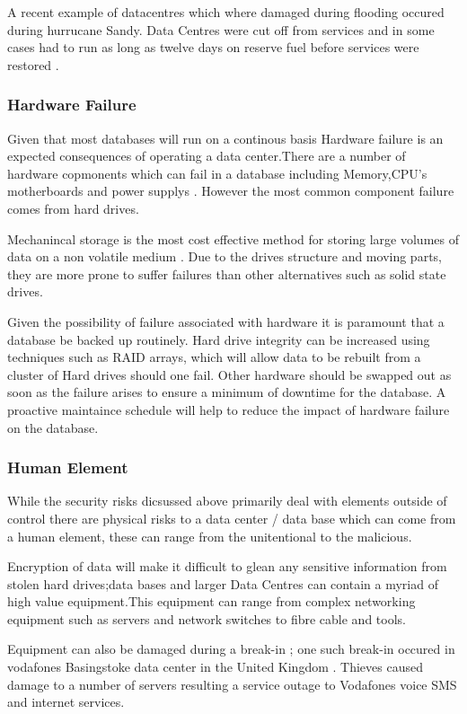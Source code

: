 \documentclass[11pt]{article}
\begin{document}
A recent example of datacentres which where damaged during flooding occured during hurrucane Sandy. Data Centres were cut off from services and in some cases had to run as long as twelve days on reserve fuel before services were restored \cite{sean4}.



\subsubsection{Hardware Failure}
Given that most databases will run on a continous basis Hardware failure is an expected consequences of operating a data center.There are a number of hardware copmonents which can fail in a database including Memory,CPU's motherboards and power supplys \cite{sean9}.  However the most common component failure comes from hard drives.

Mechanincal storage is the most cost effective method for storing large volumes of data on a non volatile medium \cite{sean2}. Due to the drives structure and moving parts, they are more prone to suffer failures than other alternatives such as  solid state drives.

Given the possibility of failure associated with hardware it is paramount that a database be backed up routinely.  Hard drive integrity can be increased using techniques such as RAID arrays, which will allow data to be rebuilt from a cluster of Hard drives should one fail.  Other hardware should be swapped out as soon as the failure arises to ensure a minimum of downtime for the database. A proactive maintaince schedule will help to reduce the impact of hardware failure on the database.

\subsubsection{Human Element}
While the security risks dicsussed above primarily deal with elements outside of control there are physical risks to a data center / data base which can come from a human element, these can range from the unitentional to the malicious.

Encryption of data will make it  difficult to glean any sensitive information from stolen hard drives;data bases and larger Data Centres can contain a myriad of high value equipment.This equipment can range from complex networking equipment such as servers and network switches to fibre cable and tools.

Equipment can also be damaged during a break-in ; one such break-in occured in vodafones Basingstoke data center in the United Kingdom \cite{sean8}.  Thieves caused damage to a number of servers resulting a service outage to Vodafones voice SMS and internet services.
\end{document}
